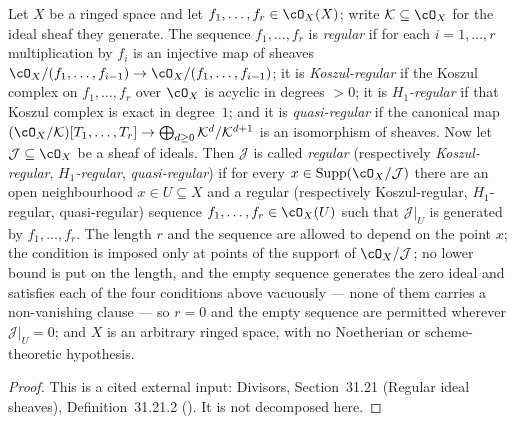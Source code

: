 \begin{definition}
\label{def:pc-regular-ideal-sheaf}
Let $X$ be a ringed space and let $f_1,\dots,f_r\in\cO_X(X)$; write
$\mathcal K\subseteq\cO_X$ for the ideal sheaf they generate.  The sequence
$f_1,\dots,f_r$ is \emph{regular} if for each $i=1,\dots,r$ multiplication
by $f_i$ is an injective map of sheaves
$\cO_X/(f_1,\dots,f_{i-1})\to\cO_X/(f_1,\dots,f_{i-1})$; it is
\emph{Koszul-regular} if the Koszul complex on $f_1,\dots,f_r$ over $\cO_X$
is acyclic in degrees $>0$; it is \emph{$H_1$-regular} if that Koszul
complex is exact in degree~$1$; and it is \emph{quasi-regular} if the
canonical map
$(\cO_X/\mathcal K)[T_1,\dots,T_r]\to\bigoplus_{d\ge0}\mathcal
K^{d}/\mathcal K^{d+1}$ is an isomorphism of sheaves.  Now let
$\mathcal J\subseteq\cO_X$ be a sheaf of ideals.  Then $\mathcal J$ is
called \emph{regular} (respectively \emph{Koszul-regular},
\emph{$H_1$-regular}, \emph{quasi-regular}) if for every
$x\in\operatorname{Supp}(\cO_X/\mathcal J)$ there are an open neighbourhood
$x\in U\subseteq X$ and a regular (respectively Koszul-regular,
$H_1$-regular, quasi-regular) sequence $f_1,\dots,f_r\in\cO_X(U)$ such that
$\mathcal J|_U$ is generated by $f_1,\dots,f_r$.  The length $r$ and the
sequence are allowed to depend on the point $x$; the condition is imposed
only at points of the support of $\cO_X/\mathcal J$; no lower bound is put
on the length, and the empty sequence generates the zero ideal and satisfies
each of the four conditions above vacuously --- none of them carries a
non-vanishing clause --- so $r=0$ and the empty sequence are permitted
wherever $\mathcal J|_U=0$; and $X$ is an arbitrary ringed space, with no
Noetherian or scheme-theoretic hypothesis.
\end{definition}
\begin{proof}
This is a cited external input: Divisors, Section~31.21 (Regular ideal
sheaves), Definition~31.21.2 ().  It is not decomposed
here.
\end{proof}

